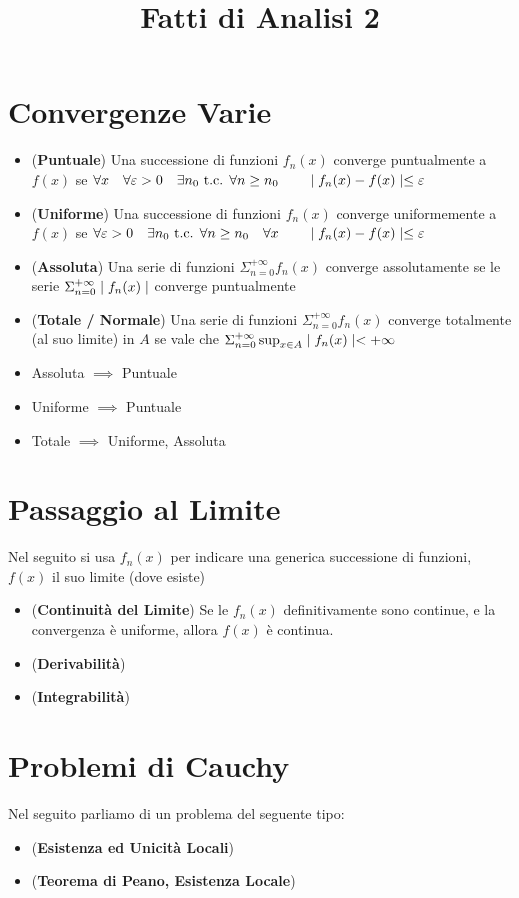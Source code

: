 \documentclass[a4paper,NoNotes,GeneralMath]{stdmdoc}
\begin{document}
	\title{Fatti di Analisi 2}
	\author{}

	\section*{Convergenze Varie}
	\begin{itemize}
		\item ({\bf Puntuale}) Una successione di funzioni $f_n(x)$ converge puntualmente a $f(x)$ se $\forall x \quad \forall \varepsilon > 0 \quad \exists n_0 \mbox{ t.c. } \forall n \ge n_0 \qquad \mid f_n(x) - f(x) \mid \le \varepsilon$
		\item ({\bf Uniforme}) Una successione di funzioni $f_n(x)$ converge uniformemente a $f(x)$ se $\forall \varepsilon > 0 \quad \exists n_0 \mbox{ t.c. } \forall n \ge n_0 \quad \forall x \qquad \mid f_n(x) - f(x) \mid \le \varepsilon$
		\item ({\bf Assoluta}) Una serie di funzioni $\Sigma_{n=0}^{+\infty} f_n(x)$ converge assolutamente se le serie $\Sigma_{n=0}^{+\infty} \mid f_n(x) \mid$ converge puntualmente
		\item ({\bf Totale / Normale}) Una serie di funzioni $\Sigma_{n=0}^{+\infty} f_n(x)$ converge totalmente (al suo limite) in $A$ se vale che $\Sigma_{n=0}^{+\infty} \sup_{x\in A} \mid f_n(x) \mid < +\infty$
		\item Assoluta $\implies$ Puntuale
		\item Uniforme $\implies$ Puntuale
		\item Totale $\implies$ Uniforme, Assoluta
	\end{itemize}

	\section*{Passaggio al Limite}
	Nel seguito si usa $f_n(x)$ per indicare una generica successione di funzioni, $f(x)$ il suo limite (dove esiste)
	\begin{itemize}
		\item ({\bf Continuità del Limite}) Se le $f_n(x)$ definitivamente sono continue, e la convergenza è uniforme, allora $f(x)$ è continua.
		\item ({\bf Derivabilità}) 
		\item ({\bf Integrabilità}) 
	\end{itemize}

	\section*{Problemi di Cauchy}
	Nel seguito parliamo di un problema del seguente tipo:
	\par
	\begin{itemize}
		\item ({\bf Esistenza ed Unicità Locali}) 
		\item ({\bf Teorema di Peano, Esistenza Locale}) 
	\end{itemize}
\end{document}
